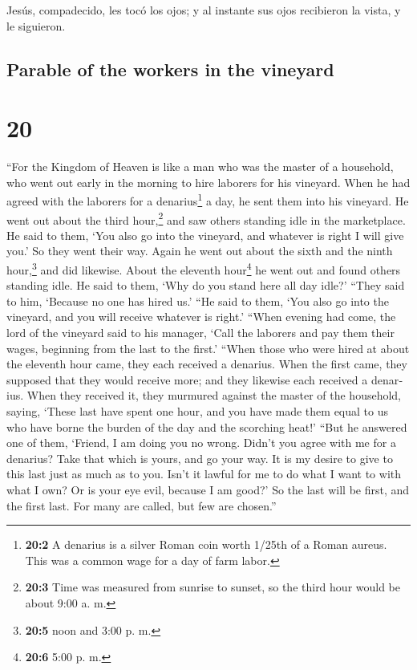 \begin{paracol}{2}
 Jesús, compadecido, les tocó los ojos; y al instante sus
ojos recibieron la vista, y le siguieron.

\switchcolumn
\begin{otherlanguage}{english}

\hypertarget{parable-of-the-workers-in-the-vineyard}{%
\subsection{Parable of the workers in the
vineyard}\label{parable-of-the-workers-in-the-vineyard}}

\hypertarget{section-39}{%
\section{20}\label{section-39}}

 ``For the Kingdom of Heaven is like a man who was the
master of a household, who went out early in the morning to hire
laborers for his vineyard.  When he had agreed with the
laborers for a denarius\footnote{\textbf{20:2} A denarius is a silver
  Roman coin worth 1/25th of a Roman aureus. This was a common wage for
  a day of farm labor.} a day, he sent them into his vineyard.
 He went out about the third hour,\footnote{\textbf{20:3}
  Time was measured from sunrise to sunset, so the third hour would be
  about 9:00 a. m.} and saw others standing idle in the marketplace.
 He said to them, `You also go into the vineyard, and
whatever is right I will give you.' So they went their way.
 Again he went out about the sixth and the ninth
hour,\footnote{\textbf{20:5} noon and 3:00 p. m.} and did likewise.
 About the eleventh hour\footnote{\textbf{20:6} 5:00 p. m.}
he went out and found others standing idle. He said to them, `Why do you
stand here all day idle?'  ``They said to him, `Because no
one has hired us.' ``He said to them, `You also go into the vineyard,
and you will receive whatever is right.'  ``When evening
had come, the lord of the vineyard said to his manager, `Call the
laborers and pay them their wages, beginning from the last to the
first.'  ``When those who were hired at about the eleventh
hour came, they each received a denarius.  When the first
came, they supposed that they would receive more; and they likewise each
received a denarius.  When they received it, they
murmured against the master of the household,  saying,
`These last have spent one hour, and you have made them equal to us who
have borne the burden of the day and the scorching heat!'
 ``But he answered one of them, `Friend, I am doing you
no wrong. Didn't you agree with me for a denarius?  Take
that which is yours, and go your way. It is my desire to give to this
last just as much as to you.  Isn't it lawful for me to
do what I want to with what I own? Or is your eye evil, because I am
good?'  So the last will be first, and the first last.
For many are called, but few are chosen.''


\end{otherlanguage}
\end{paracol}
